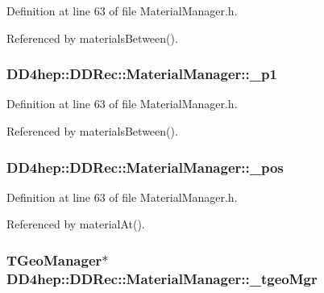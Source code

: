 Definition at line 63 of file MaterialManager.h.

Referenced by materialsBetween().\hypertarget{class_d_d4hep_1_1_d_d_rec_1_1_material_manager_a64db267d786f4371f8cf9ba5d9c805d3}{
\subsubsection[{\_\-p1}]{ {\bf DD4hep::DDRec::MaterialManager::\_\-p1}}}
\label{class_d_d4hep_1_1_d_d_rec_1_1_material_manager_a64db267d786f4371f8cf9ba5d9c805d3}


Definition at line 63 of file MaterialManager.h.

Referenced by materialsBetween().\hypertarget{class_d_d4hep_1_1_d_d_rec_1_1_material_manager_a5ca78ff1887167e4173c1a4767835c6f}{
\subsubsection[{\_\-pos}]{ {\bf DD4hep::DDRec::MaterialManager::\_\-pos}}}
\label{class_d_d4hep_1_1_d_d_rec_1_1_material_manager_a5ca78ff1887167e4173c1a4767835c6f}


Definition at line 63 of file MaterialManager.h.

Referenced by materialAt().\hypertarget{class_d_d4hep_1_1_d_d_rec_1_1_material_manager_aa5845dcf0e2d024c17250afa50f3bfb8}{
\subsubsection[{\_\-tgeoMgr}]{\setlength{\rightskip}{0pt plus 5cm}TGeoManager$\ast$ {\bf DD4hep::DDRec::MaterialManager::\_\-tgeoMgr}}}
\label{class_d_d4hep_1_1_d_d_rec_1_1_material_manager_aa5845dcf0e2d024c17250afa50f3bfb8}


